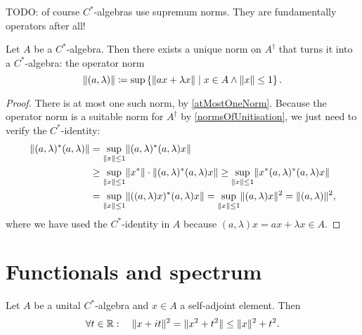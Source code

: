 TODO: of course $C^*$-algebras use supremum norms. They are fundamentally operators after all!
\begin{proposition}
Let $A$ be a $C^*$-algebra. Then there exists a unique norm on $A^\dagger$ that turns it into a $C^*$-algebra: the operator norm
\[ \lVert(a,\lambda)\rVert \coloneqq \sup\left\{ \lVert ax + \lambda x\rVert \;\middle|\; x\in A \land \lVert x\rVert\leq 1 \right\} .\]
\end{proposition}
\begin{proof}
There is at most one such norm, by \ref{atMostOneNorm}. Because the operator norm is a suitable norm for $A^\dagger$ by \ref{normsOfUnitisation}, we just need to verify the $C^*$-identity:
\begin{align*}
\lVert(a,\lambda)^*(a,\lambda)\rVert &= \sup_{\lVert x\rVert\leq 1} \lVert(a,\lambda)^*(a,\lambda)x\rVert \\
&\geq \sup_{\lVert x\rVert\leq 1} \lVert x^*\rVert\cdot\lVert(a,\lambda)^*(a,\lambda)x\rVert \geq \sup_{\lVert x\rVert\leq 1} \lVert x^*(a,\lambda)^*(a,\lambda)x\rVert \\
&= \sup_{\lVert x\rVert\leq 1} \lVert((a,\lambda)x)^*(a,\lambda)x\rVert = \sup_{\lVert x\rVert\leq 1} \lVert(a,\lambda)x\rVert^2 = \lVert(a,\lambda)\rVert^2,
\end{align*}
where we have used the $C^*$-identity in $A$ because $(a,\lambda)x = ax + \lambda x \in A$.
\end{proof}

\section{Functionals and spectrum}
\begin{lemma} \label{normSelfAdjoint}
Let $A$ be a unital $C^*$-algebra and $x\in A$ a self-adjoint element. Then
\[ \forall t\in\mathbb{R}: \quad \lVert x+it\rVert^2 = \lVert x^2+t^2\rVert \leq \lVert x\rVert^2 + t^2. \]
\end{lemma}

